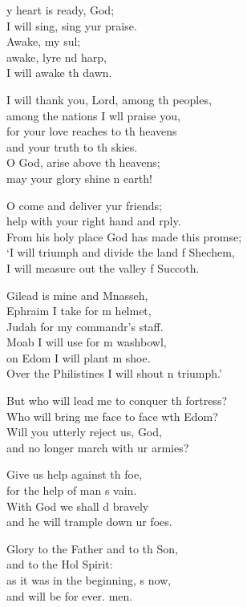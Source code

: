 \begin{psalmverse}
  \begin{patverse}
y heart is ready,  God;\Med\\
I will sing, sing yur praise.\\
Awake, my sul;\Flex\\
awake, lyre nd harp,\Med\\
I will awake th dawn.

I will thank you, Lord, among th peoples,\Med\\
among the nations I w\pointup{\i}ll praise you,\\
for your love reaches to th heavens\Med\\
and your truth to th skies.\\
O God, arise above th heavens;\Med\\
may your glory shine n earth!

O come and deliver yur friends;\Med\\
help with your right hand and rply.\\
From his holy place God has made this prom\pointup{\i}se;\Flex\\
‘I will triumph and divide the land f Shechem,\\
I will measure out the valley f Succoth.

Gilead is mine and Mnasseh,\Med\\
Ephraim I take for m helmet,\\
Judah for my commandr’s staff.\Med\\
Moab I will use for m washbowl,\\
on Edom I will plant m shoe.\Med\\
Over the Philistines I will shout \pointup{\i}n triumph.’

But who will lead me to conquer th fortress?\Med\\
Who will bring me face to face w\pointup{\i}th Edom?\\
Will you utterly reject us,  God,\Med\\
and no longer march with ur armies?

Give us help against th foe,\Med\\
for the help of man \pointup{\i}s vain.\\
With God we shall d bravely\Med\\
and he will trample down ur foes.

Glory to the Father and to th Son,\Med\\
and to the Hol Spirit:\\
as it was in the beginning, \pointup{\i}s now,\Med\\
and will be for ever. men.
  \end{patverse}
  \end{psalmverse}
